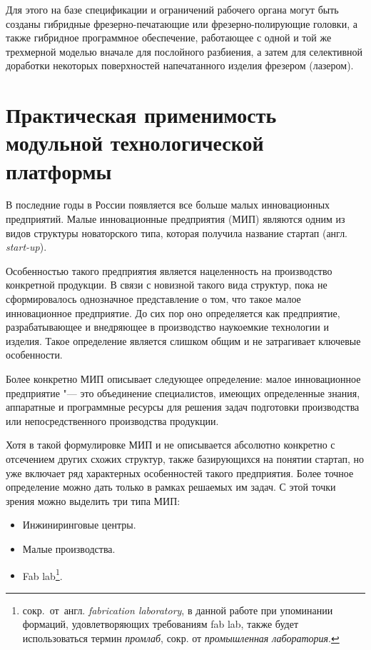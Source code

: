 Для этого на базе спецификации и ограничений рабочего органа могут быть созданы гибридные фрезерно-печатающие или фрезерно-полирующие головки, а также гибридное программное обеспечение, работающее с одной и той же трехмерной моделью вначале для послойного разбиения, а затем для селективной доработки некоторых поверхностей напечатанного изделия фрезером (лазером).

\section{Практическая применимость модульной технологической платформы}

В последние годы в России появляется все больше малых инновационных предприятий. Малые инновационные предприятия (МИП) являются одним из видов структуры новаторского типа, которая получила название стартап (англ. \textit{start-up}).

Особенностью такого предприятия является нацеленность на производство конкретной продукции. В связи с новизной такого вида структур, пока не сформировалось однозначное представление о том, что такое малое инновационное предприятие. До сих пор оно определяется как предприятие, разрабатывающее и внедряющее в производство наукоемкие технологии и изделия. Такое определение является слишком общим и не затрагивает ключевые особенности.

Более конкретно МИП описывает следующее определение: малое инновационное предприятие "--- это объединение специалистов, имеющих определенные знания, аппаратные и программные ресурсы для решения задач подготовки производства или непосредственного производства продукции.

Хотя в такой формулировке МИП и не описывается абсолютно конкретно с отсечением других схожих структур, также базирующихся на понятии стартап, но уже включает ряд характерных особенностей такого предприятия. Более точное определение можно дать только в рамках решаемых им задач. С этой точки зрения можно выделить три типа МИП:

\begin{itemize}
	\item Инжиниринговые центры.
	\item Малые производства.
	\item Fab lab\footnote{сокр.~от~англ. \textit{fabrication laboratory}, в данной работе при упоминании формаций, удовлетворяющих требованиям fab lab, также будет использоваться термин \textit{промлаб}, сокр. от \textit{промышленная лаборатория}.}.
\end{itemize}

